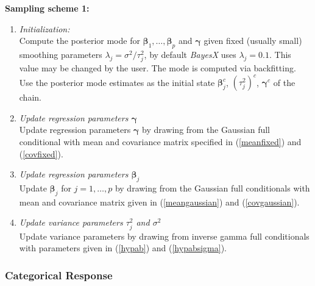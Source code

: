 \documentclass[11pt,a4paper,twoside]{bayesxarticle}
\def \betavec {\boldsymbol{\beta}}
\def \gammavec {\boldsymbol{\gamma}}
\begin{document}
{\bf Sampling scheme 1:}
\begin{enumerate}
\item {\em Initialization:} \\
Compute the posterior mode for $\betavec_1,\dots,\betavec_p$ and $\gammavec$
given fixed (usually small) smoothing parameters $\lambda_j =
\sigma^2/\tau^2_j$, by default {\em BayesX} uses $\lambda_j = 0.1$.
This value may be changed by the user. The mode is computed via
backfitting. Use the posterior mode estimates as the initial state
$\betavec_j^c$, $(\tau_j^2)^c$, $\gammavec^c$ of the chain.
\item {\em Update regression parameters $\gammavec$} \\
Update regression parameters $\gammavec$ by drawing from the Gaussian
full conditional with mean and covariance matrix specified in
(\ref{meanfixed}) and (\ref{covfixed}).
\item {\em Update regression parameters $\betavec_j$} \\
Update $\betavec_j$ for $j=1,\dots,p$ by drawing from the Gaussian
full conditionals with mean and covariance matrix given in
(\ref{meangaussian}) and (\ref{covgaussian}).
\item {\em Update variance parameters $\tau^2_j$ and $\sigma^2$} \\
Update variance parameters by drawing from inverse gamma full
conditionals with parameters given in (\ref{hypab}) and
(\ref{hypabsigma}).
\end{enumerate}

\subsubsection{Categorical Response}
\label{mulitcategoricalresp} 
\end{document}

